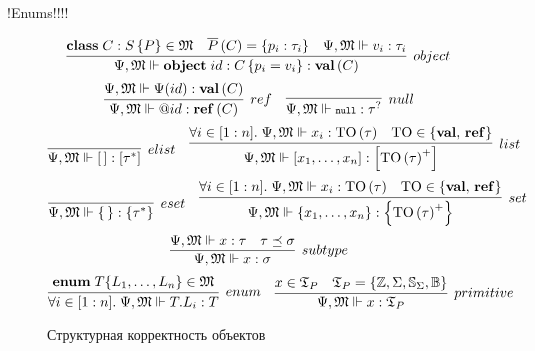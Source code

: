 !Enums!!!!

\begin{figure}[htbp]
	\centering
$$
	\infer[object]{
		\fromMM \Object{id}{C}{p_i = v_i} : \ClassT{C}
	}{
		\Class{C}{S}{P} \in \MM{M}&
		\AllProps{C} = \{p_i : \tau_i\}&
		\fromMM v_i : \tau_i
	}
$$
$$
\infer[ref]{
	\fromMM \Ref{id} : \RefT{C}
}{
	\fromMM \RContext(id) : \ClassT{C}
}
\quad
\infer[null]{
	\fromMM \Null : \NullableT{\tau}
}{}
$$
$$
\infer[elist]{
	\fromMM \List{\,} : \ListT{\tau^*}
}{}
\quad
\infer[list]{
	\fromMM \List{x_1, \ldots, x_n} : \List{\type{\mbox{TO}}{\tau}^+}
}{
	\forall i\in[1:n]. \; \fromMM x_i : \type{\mbox{TO}}{\tau} &
	\mbox{TO} \in \{\valts,\, \refts\}
}
$$
$$
\infer[eset]{
	\fromMM \Set{\,} : \SetT{\tau^*}
}{}
\quad
\infer[set]{
	\fromMM \Set{x_1, \ldots, x_n} : \SetT{\type{\mbox{TO}}{\tau}^+}
}{
	\forall i\in[1:n]. \; \fromMM x_i : \type{\mbox{TO}}{\tau} &
	\mbox{TO} \in \{\valts,\, \refts\}
}
$$
$$
\infer[subtype]{
	\fromMM x : \sigma
}{
	\fromMM x : \tau &
	\tau \subtype \sigma
}
$$
$$
\infer[enum]{
	\forall i \in [1:n]. \; \fromMM T.L_i : T
}{
	\mathbf{enum}\;T\{L_1,\ldots,L_n\} \in \MM{M}
}
\quad
\infer[primitive]{
	\fromMM x : \Types_P
}{
	x \in \Types_P & 
	\Types_P = \{\IntegerT, \CharT, \StringT, \BooleanT\}
}
$$
	\caption{Структурная корректность объектов}\label{TypesMM}
\end{figure}


